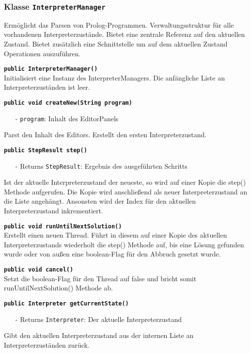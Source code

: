 \documentclass[parskip=full,11pt,twoside]{scrartcl}
\begin{document}
\subsubsection{Klasse \texttt{InterpreterManager}}

Ermöglicht das Parsen von Prolog-Programmen. Verwaltungsstruktur für alle vorhandenen Interpreterzustände. Bietet eine zentrale Referenz auf den aktuellen Zustand. Bietet zusätzlich eine Schnittstelle um auf dem aktuellen Zustand Operationen auszuführen.

\textbf{\texttt{public InterpreterManager()}}\\
Initialisiert eine Instanz des InterpreterManagers. Die anfängliche Liste an Interpreterzuständen ist leer.

\textbf{\texttt{public void createNew(String program)}}
\begin{itemize}[noitemsep]
	\item[-] \texttt{program}: Inhalt des EditorPanels
\end{itemize}
Parst den Inhalt des Editors. Erstellt den ersten Interpreterzustand.

\textbf{\texttt{public StepResult step()}}
\begin{itemize}[noitemsep]
    \item[-] Returns \texttt{StepResult}: Ergebnis des ausgeführten Schritts
\end{itemize}
Ist der aktuelle Interpreterzustand der neueste, so wird auf einer Kopie die step() Methode aufgerufen. Die Kopie wird anschließend als neuer Interpreterzustand an die Liste angehängt. Ansonsten wird der Index für den aktuellen Interpreterzustand inkrementiert.

\textbf{\texttt{public void runUntilNextSolution()}}\\
Erstellt einen neuen Thread. Führt in diesem auf einer Kopie des aktuellen Interpreterzustands wiederholt die step() Methode auf, bis eine Lösung gefunden wurde oder von außen eine boolean-Flag für den Abbruch gesetzt wurde.

\textbf{\texttt{public void cancel()}}\\
Setzt die boolean-Flag für den Thread auf false und bricht somit runUntilNextSolution() Methode ab. 

\textbf{\texttt{public Interpreter getCurrentState()}}
\begin{itemize}[noitemsep]
    \item[-] Returns \texttt{Interpreter}: Der aktuelle Interpreterzustand
\end{itemize}
Gibt den aktuellen Interpreterzustand aus der internen Liste an Interpreterzuständen zurück.
\end{document}
